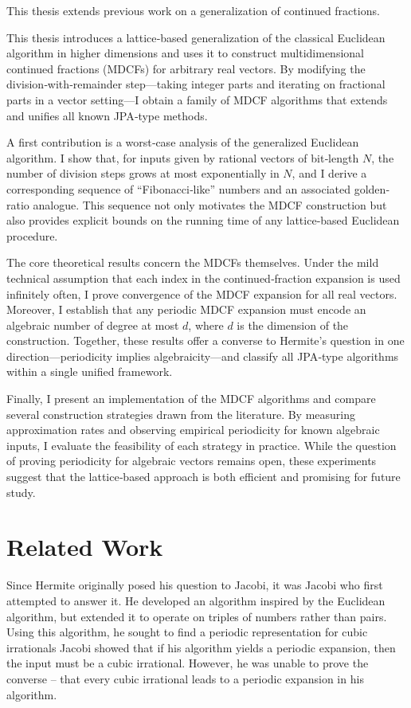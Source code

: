 This thesis extends previous work on a generalization of continued fractions.

This thesis introduces a lattice‐based generalization of the classical Euclidean
algorithm in higher dimensions and uses it to construct multidimensional continued
fractions (MDCFs) for arbitrary real vectors.  By modifying the division‐with‐remainder
step—taking integer parts and iterating on fractional parts in a vector setting—I
obtain a family of MDCF algorithms that extends and unifies all known JPA‐type methods.

A first contribution is a worst‐case analysis of the generalized Euclidean algorithm.
I show that, for inputs given by rational vectors of bit‐length $N$, the number of
division steps grows at most exponentially in $N$, and I derive a corresponding
sequence of “Fibonacci‐like” numbers and an associated golden‐ratio analogue.  This
sequence not only motivates the MDCF construction but also provides explicit bounds
on the running time of any lattice‐based Euclidean procedure.

The core theoretical results concern the MDCFs themselves.  Under the mild technical
assumption that each index in the continued‐fraction expansion is used infinitely
often, I prove convergence of the MDCF expansion for all real vectors.  Moreover,
I establish that any periodic MDCF expansion must encode an algebraic number of
degree at most $d$, where $d$ is the dimension of the construction.  Together,
these results offer a converse to Hermite’s question in one direction—periodicity
implies algebraicity—and classify all JPA‐type algorithms within a single unified
framework.

Finally, I present an implementation of the MDCF algorithms and compare several
construction strategies drawn from the literature.  By measuring approximation
rates and observing empirical periodicity for known algebraic inputs, I evaluate
the feasibility of each strategy in practice.  While the question of proving
periodicity for algebraic vectors remains open, these experiments suggest that
the lattice‐based approach is both efficient and promising for future study.

\section{Related Work}

Since Hermite originally posed his question to Jacobi, it was Jacobi who first attempted to answer it.
He developed an algorithm inspired by the Euclidean algorithm,
but extended it to operate on triples of numbers rather than pairs.
Using this algorithm, he sought to find a periodic representation for cubic irrationals
Jacobi showed that if his algorithm yields a periodic expansion,
then the input must be a cubic irrational.
However, he was unable to prove the converse -- that every cubic irrational leads to a periodic expansion in his algorithm.

